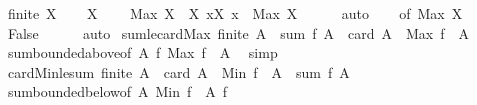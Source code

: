 \begin{isabellebody}
\ {\isachardoublequoteopen}finite\ X{\isachardoublequoteclose}\isanewline
\ \ \isamarkupfalse%
\ {\isacartoucheopen}X\ {\isasymnoteq}\ {\isacharbraceleft}{\kern0pt}{\isacharbraceright}{\kern0pt}{\isacartoucheclose}\ \isamarkupfalse%
\ {\isachardoublequoteopen}Max\ X\ {\isasymin}\ X{\isachardoublequoteclose}\ {\isachardoublequoteopen}{\isasymforall}x{\isasymin}X{\isachardot}{\kern0pt}\ x\ {\isasymle}\ Max\ X{\isachardoublequoteclose}\isanewline
\ \ \ \ \isamarkupfalse%
\ auto\isanewline
\ \ \isamarkupfalse%
\ {\isacharasterisk}{\kern0pt}{\isacharbrackleft}{\kern0pt}of\ {\isachardoublequoteopen}Max\ X{\isachardoublequoteclose}{\isacharbrackright}{\kern0pt}\ \isamarkupfalse%
\ False\isanewline
\ \ \ \ \isamarkupfalse%
\ auto\isanewline
{}\isamarkupfalse%
%
\endisatagproof
{\isafoldproof}%
%
\isadelimproof
\isanewline
%
\endisadelimproof
\isanewline
{}\isamarkupfalse%
\isanewline
\isanewline
{}\isamarkupfalse%
\ sum{\isacharunderscore}{\kern0pt}le{\isacharunderscore}{\kern0pt}card{\isacharunderscore}{\kern0pt}Max{\isacharcolon}{\kern0pt}\ {\isachardoublequoteopen}finite\ A\ {\isasymLongrightarrow}\ sum\ f\ A\ {\isasymle}\ card\ A\ {\isacharasterisk}{\kern0pt}\ Max\ {\isacharparenleft}{\kern0pt}f\ {\isacharbackquote}{\kern0pt}\ A{\isacharparenright}{\kern0pt}{\isachardoublequoteclose}\isanewline
%
\isadelimproof
%
\endisadelimproof
%
\isatagproof
{}\isamarkupfalse%
\ sum{\isacharunderscore}{\kern0pt}bounded{\isacharunderscore}{\kern0pt}above{\isacharbrackleft}{\kern0pt}of\ A\ f\ {\isachardoublequoteopen}Max\ {\isacharparenleft}{\kern0pt}f\ {\isacharbackquote}{\kern0pt}\ A{\isacharparenright}{\kern0pt}{\isachardoublequoteclose}{\isacharbrackright}{\kern0pt}\ \isamarkupfalse%
\ simp%
\endisatagproof
{\isafoldproof}%
%
\isadelimproof
\isanewline
%
\endisadelimproof
\isanewline
{}\isamarkupfalse%
\ card{\isacharunderscore}{\kern0pt}Min{\isacharunderscore}{\kern0pt}le{\isacharunderscore}{\kern0pt}sum{\isacharcolon}{\kern0pt}\ {\isachardoublequoteopen}finite\ A\ {\isasymLongrightarrow}\ card\ A\ {\isacharasterisk}{\kern0pt}\ Min\ {\isacharparenleft}{\kern0pt}f\ {\isacharbackquote}{\kern0pt}\ A{\isacharparenright}{\kern0pt}\ {\isasymle}\ sum\ f\ A{\isachardoublequoteclose}\isanewline
%
\isadelimproof
%
\endisadelimproof
%
\isatagproof
{}\isamarkupfalse%
\ sum{\isacharunderscore}{\kern0pt}bounded{\isacharunderscore}{\kern0pt}below{\isacharbrackleft}{\kern0pt}of\ A\ {\isachardoublequoteopen}Min\ {\isacharparenleft}{\kern0pt}f\ {\isacharbackquote}{\kern0pt}\ A{\isacharparenright}{\kern0pt}{\isachardoublequoteclose}\ f{\isacharbrackright}{\kern0pt}\ \isamarkupfalse%

\end{isabellebody}
